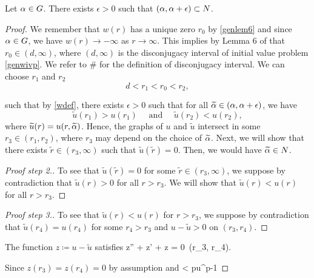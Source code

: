 \begin{lemma}\label{genlem7}
Let $\alpha \in G$. There exists $\epsilon > 0$ such that $(\alpha, \alpha + \epsilon)
\subset N$. 
\end{lemma}
\begin{proof}
\donegroup
We remember that $w(r)$ has a unique zero $r_0$ by \cref{genlem6} and since $\alpha
\in G$, we have $w(r) \to -\infty$ as $r \to \infty$. 
This implies by Lemma 6 of \cite[p.~249]{kwong} that $r_0 \in (d, \infty)$,
where $(d, \infty)$ is the disconjugacy interval of initial value problem 
\eqref{genwivp}.  We {\red refer to \#} for the definition of disconjugacy
interval. We can choose $r_1$ and $r_2$
\[ d < r_1 < r_0 < r_2, \]

such that by \eqref{wdef}, there exists $\epsilon > 0$ 
such that for all $\widetilde{\alpha} \in (\alpha, \alpha + \epsilon)$, we have
\[
\tilde{u}(r_1) > u(r_1)\quad\text{ and }\quad \tilde{u}(r_2) < u(r_2),
\]
\endgroup
where $\widetilde{u}(r) = u(r, \widetilde{\alpha})$. Hence, the graphs of $u$ and $\tilde{u}$
intersect in some $r_3 \in (r_1, r_2)$, where $r_3$ may depend on the choice of
$\widetilde{\alpha}$. Next, we will show that there exists $\tilde{r} \in (r_3, \infty)$
such that $\tilde{u}(\tilde{r}) = 0$. Then, we would have $\widetilde{\alpha} \in N$.

\begin{proof}[Proof step 2.] To see that $\tilde{u}(\tilde{r})=0$ for some
$\tilde{r} \in (r_3, \infty)$, we suppose by contradiction that 
$\tilde{u}(r) > 0$ for all $r > r_3$. We will show that $\tilde{u}(r) < u(r)$
for all $r > r_3$. 
\end{proof}

\begin{proof}[Proof step 3.] To see that $\tilde{u}(r) < u(r)$ for $r > r_3$, we
suppose by contradiction that $\tilde{u}(r_4) = u(r_4)$ for some $r_4 > r_3$ and
$u - \tilde{u} > 0$ on $(r_3, r_4)$.
\end{proof}

The function $z \coloneqq u - \tilde{u}$ satisfies
\be \label{zivp}
z'' +  z' +  z = 0\quad{}~(r_3, r_4). 
\ee


Since $z(r_3) = z(r_4) = 0$ by assumption and
\be \label{zcomp} 
 < pu^{p-1} 
\ee


\end{proof}
